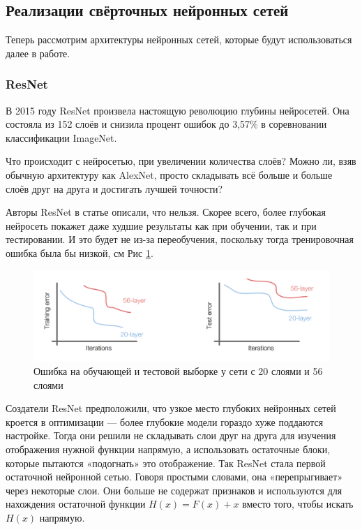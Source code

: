 \subsection{Реализации свёрточных нейронных сетей} \label{nn_archs_lit}
Теперь рассмотрим архитектуры нейронных сетей, которые будут использоваться далее в работе.

\subsubsection{ResNet} \label{resnet_rev}

В 2015 году ResNet произвела настоящую революцию глубины нейросетей. Она состояла из 152 слоёв и снизила процент ошибок до 3,57\%\cite{resnet} в соревновании классификации ImageNet.

Что происходит с нейросетью, при увеличении количества слоёв? Можно ли, взяв обычную архитектуру как AlexNet, просто складывать всё больше и больше слоёв друг на друга и достигать лучшей точности? 

Авторы ResNet в статье описали, что нельзя. Скорее всего, более глубокая нейросеть покажет даже худшие результаты как при обучении, так и при тестировании. И это будет не из-за переобучения, поскольку тогда тренировочная ошибка была бы низкой, см Рис \ref{fig:train_error_deep_net}.

\begin{figure} [ht]
    \centering
    \includegraphics[width=\textwidth*2/3]{images/train_error_deep_net.png}
    \caption{Ошибка на обучающей и тестовой выборке у сети с 20 слоями и 56 слоями}
    \label{fig:train_error_deep_net}
\end{figure}

Создатели ResNet предположили, что узкое место глубоких нейронных сетей кроется в оптимизации — более глубокие модели гораздо хуже поддаются настройке. Тогда они решили не складывать слои друг на друга для изучения отображения нужной функции напрямую, а использовать остаточные блоки, которые пытаются «подогнать» это отображение. Так ResNet стала первой остаточной нейронной сетью\cite{resnet}. Говоря простыми словами, она «перепрыгивает» через некоторые слои. Они больше не содержат признаков и используются для нахождения остаточной функции $H(x) = F(x) + x$ вместо того, чтобы искать $H(x)$ напрямую.

